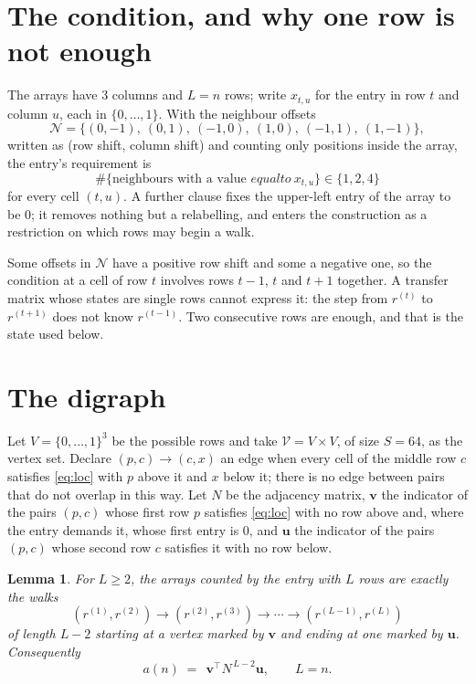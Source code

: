 \documentclass[11pt,a4paper]{article}
\theoremstyle{plain}
\newtheorem{lemma}[theorem]{Lemma}
\theoremstyle{definition}
\begin{document}
\section{The condition, and why one row is not enough}

The arrays have $3$ columns and $L=n$ rows; write $x_{t,u}$ for the entry in
row $t$ and column $u$, each in $\{0,\dots,1\}$. With the neighbour offsets
\[
\mathcal N=\{(0,-1),\ (0,1),\ (-1,0),\ (1,0),\ (-1,1),\ (1,-1)\},
\]
written as (row shift, column shift) and counting only positions inside the array, the
entry's requirement is
\begin{equation}\label{eq:loc}
\#\{\text{neighbours with a value }equal to\ x_{t,u}\}\in\{1,2,4\}
\end{equation}
for every cell $(t,u)$. A further clause fixes the upper-left entry of the array to be $0$; it removes nothing but a relabelling, and enters the construction as a restriction on which rows may begin a walk.

Some offsets in $\mathcal N$ have a positive row shift and some a negative one, so the
condition at a cell of row $t$ involves rows $t-1$, $t$ and $t+1$ together. A transfer
matrix whose states are single rows cannot express it: the step from $r^{(t)}$ to
$r^{(t+1)}$ does not know $r^{(t-1)}$. Two consecutive rows are enough, and that is
the state used below.

\section{The digraph}

Let $V=\{0,\dots,1\}^{3}$ be the possible rows and take
$\mathcal V=V\times V$, of size $S=64$, as the vertex set. Declare $(p,c)\to(c,x)$ an edge
when every cell of the middle row $c$ satisfies \eqref{eq:loc} with $p$ above it and $x$
below it; there is no edge between pairs that do not overlap in this way. Let $N$ be the
adjacency matrix, $\mathbf{v}$ the indicator of the pairs $(p,c)$ whose first row $p$
satisfies \eqref{eq:loc} with no row above and, where the entry demands it, whose first entry is $0$, and $\mathbf{u}$ the indicator of
the pairs $(p,c)$ whose second row $c$ satisfies it with no row below.

\begin{lemma}\label{lem:walk}
For $L\ge2$, the arrays counted by the entry with $L$ rows are exactly the walks
\[
(r^{(1)},r^{(2)})\to(r^{(2)},r^{(3)})\to\cdots\to(r^{(L-1)},r^{(L)})
\]
of length $L-2$ starting at a vertex marked by $\mathbf{v}$ and ending at one marked by
$\mathbf{u}$. Consequently
\[
a(n)\;=\;\,\mathbf{v}^{\!\top}N^{\,L-2}\mathbf{u},\qquad L=n .
\]
\end{lemma}
\end{document}
